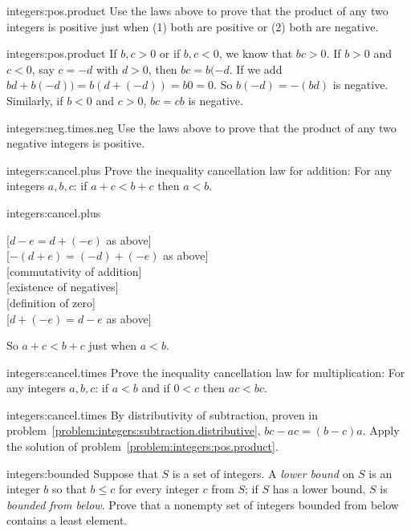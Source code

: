 \begin{problem}{integers:pos.product}
Use the laws above to prove that the product of any two integers is positive just when (1) both are positive or (2) both are negative.
\end{problem}
\begin{answer}{integers:pos.product}
If \(b,c >0\) or if \(b,c < 0\), we know that \(bc>0\).
If \(b>0\) and \(c<0\), say \(c=-d\) with \(d>0\), then \(bc=b(-d\).
If we add \(bd+b(-d))=b(d+(-d))=b0=0\).
So \(b(-d)=-(bd)\) is negative.
Similarly, if \(b<0\) and \(c>0\), \(bc=cb\) is negative.
\end{answer}
\begin{problem}{integers:neg.times.neg}
Use the laws above to prove that the product of any two negative integers is positive.
\end{problem}
\begin{problem}{integers:cancel.plus}
Prove the inequality cancellation law for addition: For any integers \(a, b, c\): if \(a+c<b+c\) then \(a<b\).
\end{problem}
\begin{answer}{integers:cancel.plus}
\begin{twocolumnproof}
[\(d-e=d+(-e)\) as above] \\
[\(-(d+e)=(-d)+(-e)\) as above] \\
[commutativity of addition] \\
[existence of negatives] \\
[definition of zero] \\
[\(d+(-e)=d-e\) as above]
\end{twocolumnproof}
So \(a+c < b+c\) just when \(a<b\).
\end{answer}
\begin{problem}{integers:cancel.times}
Prove the inequality cancellation law for multiplication: For any integers \(a, b, c\): if \(a<b\) and if \(0<c\) then \(ac<bc\).
\end{problem}
\begin{answer}{integers:cancel.times}
By distributivity of subtraction, proven in problem~\vref{problem:integers:subtraction.distributive}, \(bc-ac=(b-c)a\).
Apply the solution of problem~\vref{problem:integers:pos.product}.
\end{answer}
\begin{problem}{integers:bounded}
Suppose that \(S\) is a set of integers.
A \emph{lower bound} on \(S\) is an integer \(b\) so that \(b\le c\) for every integer \(c\) from \(S\); if \(S\) has a lower bound, \(S\) is \emph{bounded from below}.
Prove that a nonempty set of integers bounded from below contains a least element.
\end{problem}

